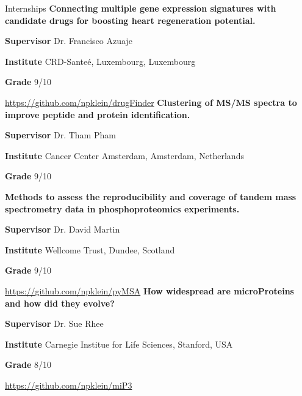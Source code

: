 \begin{rubric}{Internships}
%
%
%
	\textbf{Connecting multiple gene expression signatures with candidate drugs for boosting heart regeneration potential.} \par
	\textbf{Supervisor} Dr. Francisco Azuaje \par
	\textbf{Institute} CRD-Sante\'e, Luxembourg, Luxembourg \par
	\textbf{Grade} 9/10 \par
	\url{https://github.com/npklein/drugFinder}
%
%
\textbf{Clustering of MS/MS spectra to improve peptide and protein identification.} \par
\textbf{Supervisor} Dr. Tham Pham \par
\textbf{Institute} Cancer Center Amsterdam, Amsterdam, Netherlands\par
\textbf{Grade} 9/10 \par
%
\textbf{Methods to assess the reproducibility and coverage of tandem mass spectrometry data in phosphoproteomics experiments.} \par
\textbf{Supervisor} Dr. David Martin \par
\textbf{Institute} Wellcome Trust, Dundee, Scotland \par
\textbf{Grade} 9/10 \par
\url{https://github.com/npklein/pyMSA}
%
%
\textbf{How widespread are microProteins and how did they evolve?} \par
\textbf{Supervisor} Dr. Sue Rhee \par
\textbf{Institute} Carnegie Institue for Life Sciences, Stanford, USA \par
\textbf{Grade} 8/10 \par
\url{https://github.com/npklein/miP3}
%
\end{rubric}